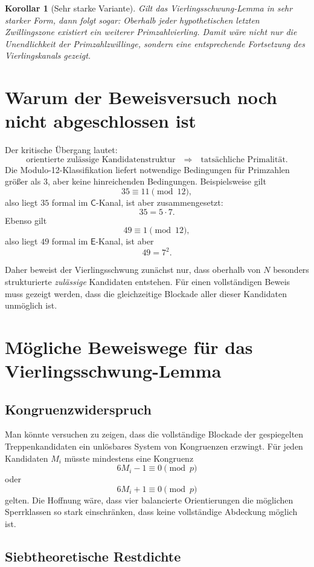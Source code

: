 \documentclass[11pt,a4paper]{article}
\newtheorem{corollary}{Korollar}
\theoremstyle{definition}
\newcommand{\E}{\mathsf{E}}
\newcommand{\C}{\mathsf{C}}
\begin{document}
\begin{corollary}[Sehr starke Variante]
Gilt das Vierlingsschwung-Lemma in sehr starker Form, dann folgt sogar: Oberhalb jeder hypothetischen letzten Zwillingszone existiert ein weiterer Primzahlvierling. Damit wäre nicht nur die Unendlichkeit der Primzahlzwillinge, sondern eine entsprechende Fortsetzung des Vierlingskanals gezeigt.
\end{corollary}

\section{Warum der Beweisversuch noch nicht abgeschlossen ist}

Der kritische Übergang lautet:
\[
\text{orientierte zulässige Kandidatenstruktur}
\quad\Longrightarrow\quad
\text{tatsächliche Primalität.}
\]
Die Modulo-12-Klassifikation liefert notwendige Bedingungen für Primzahlen größer als $3$, aber keine hinreichenden Bedingungen. Beispielsweise gilt
\[
35\equiv 11\pmod {12},
\]
also liegt $35$ formal im $\C$-Kanal, ist aber zusammengesetzt:
\[
35=5\cdot 7.
\]
Ebenso gilt
\[
49\equiv 1\pmod {12},
\]
also liegt $49$ formal im $\E$-Kanal, ist aber
\[
49=7^2.
\]

Daher beweist der Vierlingsschwung zunächst nur, dass oberhalb von $N$ besonders strukturierte \emph{zulässige} Kandidaten entstehen. Für einen vollständigen Beweis muss gezeigt werden, dass die gleichzeitige Blockade aller dieser Kandidaten unmöglich ist.

\section{Mögliche Beweiswege für das Vierlingsschwung-Lemma}

\subsection{Kongruenzwiderspruch}

Man könnte versuchen zu zeigen, dass die vollständige Blockade der gespiegelten Treppenkandidaten ein unlösbares System von Kongruenzen erzwingt. Für jeden Kandidaten $M_i$ müsste mindestens eine Kongruenz
\[
6M_i-1\equiv 0\pmod p
\]
oder
\[
6M_i+1\equiv 0\pmod p
\]
gelten. Die Hoffnung wäre, dass vier balancierte Orientierungen die möglichen Sperrklassen so stark einschränken, dass keine vollständige Abdeckung möglich ist.

\subsection{Siebtheoretische Restdichte}
\end{document}
